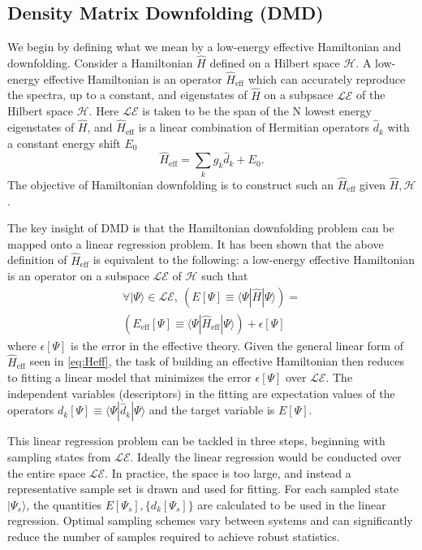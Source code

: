 \documentclass[12pt]{article}
\begin{document}
\subsection{Density Matrix Downfolding (DMD)}
We begin by defining what we mean by a low-energy effective Hamiltonian and downfolding.
Consider a Hamiltonian $\hat{H}$ defined on a Hilbert space $\mathcal{H}$.
A low-energy effective Hamiltonian is an operator $\hat{H}_\text{eff}$ which can accurately reproduce the spectra, up to a constant, and eigenstates of $\hat{H}$ on a subpsace $\mathcal{LE}$ of the Hilbert space $\mathcal{H}$.
Here $\mathcal{LE}$ is taken to be the span of the N lowest energy eigenstates of $\hat{H}$, and $\hat{H}_\text{eff}$ is a linear combination of Hermitian operators $\hat{d}_k$ with a constant energy shift $E_0$
\begin{equation}
\hat{H}_\text{eff} = \sum_{k} g_k \hat{d}_k  + E_0.
\label{eq:Heff}
\end{equation}
The objective of Hamiltonian downfolding is to construct such an $\hat{H}_\text{eff}$ given $\hat{H}, \mathcal{H}$.

The key insight of DMD is that the Hamiltonian downfolding problem can be mapped onto a linear regression problem.
It has been shown that the above definition of $\hat{H}_\text{eff}$ is equivalent to the following: a low-energy effective Hamiltonian is an operator on a subspace $\mathcal{LE}$ of $\mathcal{H}$ such that 
\begin{equation}
\begin{split}
\forall |\Psi\rangle \in \mathcal{LE},\ (E[\Psi] \equiv \langle \Psi|\hat{H} | \Psi \rangle)  = \\ (E_\text{eff}[\Psi] \equiv \langle \Psi | \hat{H}_\text{eff} | \Psi \rangle) + \epsilon[\Psi]
\end{split}
\label{eq:DMD}
\end{equation}
where $\epsilon[\Psi]$ is the error in the effective theory.
Given the general linear form of $\hat{H}_\text{eff}$ seen in \eqref{eq:Heff}, 
the task of building an effective Hamiltonian then reduces to fitting a linear model that minimizes the error $\epsilon[\Psi]$ over $\mathcal{LE}$.
The independent variables (descriptors) in the fitting are expectation values of the operators $d_k[\Psi] \equiv \langle \Psi |\hat{d}_k|\Psi \rangle$ and the target variable is $E[\Psi]$.

This linear regression problem can be tackled in three steps, beginning with sampling states from $\mathcal{LE}$.
Ideally the linear regression would be conducted over the entire space $\mathcal{LE}$. 
In practice, the space is too large, and instead a representative sample set is drawn and used for fitting.
For each sampled state $|\Psi_s\rangle$, the quantities $E[\Psi_s], \{d_k[\Psi_s]\}$ are calculated to be used in the linear regression.
Optimal sampling schemes vary between systems and can significantly reduce the number of samples required to achieve robust statistics.
\end{document}

